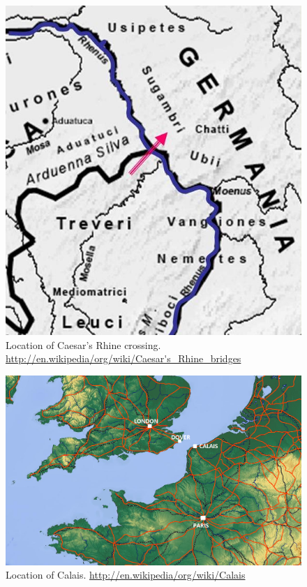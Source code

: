 \documentclass[twocolumn]{book}
\begin{document}
\begin{figure}
   \begin{center}
      \includegraphics[width=0.9\columnwidth]{images/Rhine-Crossing}
      \caption{%
         Location of Caesar's Rhine crossing\@.
         \url{http://en.wikipedia/org/wiki/Caesar's_Rhine_bridges}
      }\label{fig:Rhine-Crossing}
   \end{center}
\end{figure}

\begin{figure}
   \begin{center}
      \includegraphics[width=0.9\columnwidth]{images/LondonCalaisParis}
      \caption{%
         Location of Calais\@.
         \url{http://en.wikipedia/org/wiki/Calais}
      }\label{fig:LondonCalaisParis}
   \end{center}
\end{figure}
\end{document}
